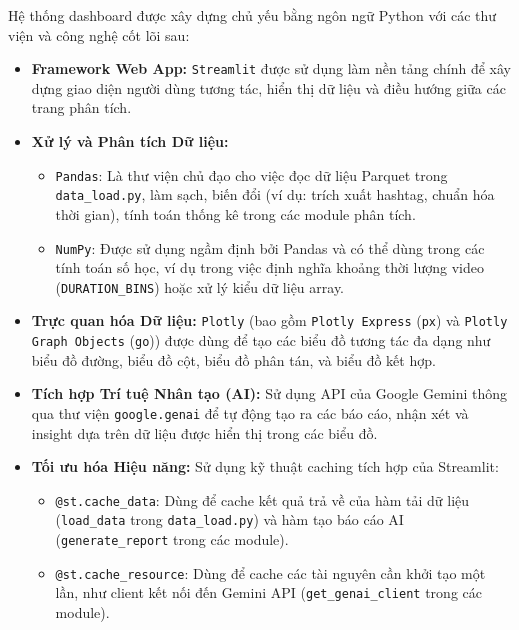 \noindent
Hệ thống dashboard được xây dựng chủ yếu bằng ngôn ngữ Python với các thư viện và công nghệ cốt lõi sau:
\begin{itemize}
    \item \textbf{Framework Web App:} \texttt{Streamlit} được sử dụng làm nền tảng chính để xây dựng giao diện người dùng tương tác, hiển thị dữ liệu và điều hướng giữa các trang phân tích.

    \item \textbf{Xử lý và Phân tích Dữ liệu:}
        \begin{itemize}
            \item \texttt{Pandas}: Là thư viện chủ đạo cho việc đọc dữ liệu Parquet trong \texttt{data\_load.py}, làm sạch, biến đổi (ví dụ: trích xuất hashtag, chuẩn hóa thời gian), tính toán thống kê trong các module phân tích.
            
            \item \texttt{NumPy}: Được sử dụng ngầm định bởi Pandas và có thể dùng trong các tính toán số học, ví dụ trong việc định nghĩa khoảng thời lượng video (\texttt{DURATION\_BINS}) hoặc xử lý kiểu dữ liệu array.
        \end{itemize}

    \item \textbf{Trực quan hóa Dữ liệu:} \texttt{Plotly} (bao gồm \texttt{Plotly Express} (\texttt{px}) và \texttt{Plotly Graph Objects} (\texttt{go})) được dùng để tạo các biểu đồ tương tác đa dạng như biểu đồ đường, biểu đồ cột, biểu đồ phân tán, và biểu đồ kết hợp.
    
    \item \textbf{Tích hợp Trí tuệ Nhân tạo (AI):} Sử dụng API của Google Gemini thông qua thư viện \texttt{google.genai} để tự động tạo ra các báo cáo, nhận xét và insight dựa trên dữ liệu được hiển thị trong các biểu đồ.
    
    \item \textbf{Tối ưu hóa Hiệu năng:} Sử dụng kỹ thuật caching tích hợp của Streamlit:
    \begin{itemize}
        \item \texttt{@st.cache\_data}: Dùng để cache kết quả trả về của hàm tải dữ liệu (\texttt{load\_data} trong \texttt{data\_load.py}) và hàm tạo báo cáo AI (\texttt{generate\_report} trong các module).
        
        \item \texttt{@st.cache\_resource}: Dùng để cache các tài nguyên cần khởi tạo một lần, như client kết nối đến Gemini API (\texttt{get\_genai\_client} trong các module).
    \end{itemize}
\end{itemize}


